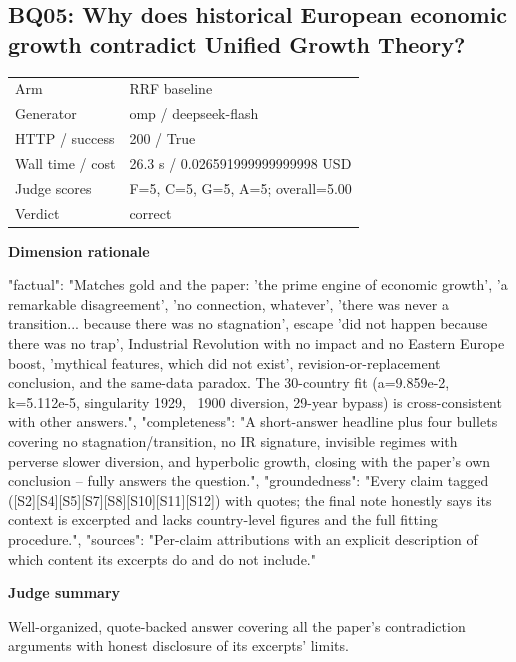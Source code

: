 \documentclass[10pt]{article}
\begin{document}
\subsection{BQ05: Why does historical European economic growth contradict Unified Growth Theory?}
\begin{tabular}{@{}ll@{}}
Arm & RRF baseline\\
Generator & omp / deepseek-flash\\
HTTP / success & 200 / True\\
Wall time / cost & 26.3 s / 0.026591999999999998 USD\\
Judge scores & F=5, C=5, G=5, A=5; overall=5.00\\
Verdict & correct\\
\end{tabular}

\textbf{Dimension rationale}
\begin{EvidenceText}
{
  "factual": "Matches gold and the paper: 'the prime engine of economic growth', 'a remarkable disagreement', 'no connection, whatever', 'there was never a transition... because there was no stagnation', escape 'did not happen because there was no trap', Industrial Revolution with no impact and no Eastern Europe boost, 'mythical features, which did not exist', revision-or-replacement conclusion, and the same-data paradox. The 30-country fit (a=9.859e-2, k=5.112e-5, singularity 1929, ~1900 diversion, 29-year bypass) is cross-consistent with other answers.",
  "completeness": "A short-answer headline plus four bullets covering no stagnation/transition, no IR signature, invisible regimes with perverse slower diversion, and hyperbolic growth, closing with the paper's own conclusion -- fully answers the question.",
  "groundedness": "Every claim tagged ([S2][S4][S5][S7][S8][S10][S11][S12]) with quotes; the final note honestly says its context is excerpted and lacks country-level figures and the full fitting procedure.",
  "sources": "Per-claim attributions with an explicit description of which content its excerpts do and do not include."
}
\end{EvidenceText}

\textbf{Judge summary}
\begin{EvidenceText}
Well-organized, quote-backed answer covering all the paper's contradiction arguments with honest disclosure of its excerpts' limits.
\end{EvidenceText}
\end{document}
